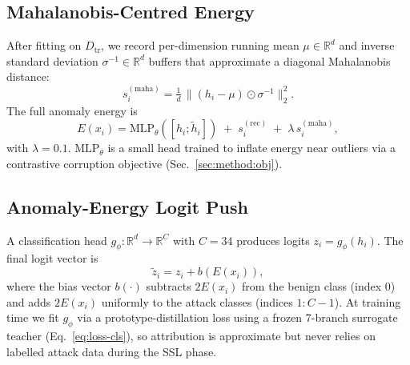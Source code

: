 \documentclass[journal,twoside]{IEEEtran}
\begin{document}
\subsection{Mahalanobis-Centred Energy}
After fitting on $D_\text{tr}$, we record per-dimension running mean
$\mu \in \mathbb{R}^d$ and inverse standard deviation $\sigma^{-1} \in
\mathbb{R}^d$ buffers that approximate a diagonal Mahalanobis distance:
\begin{equation}
  s^{(\text{maha})}_i = \tfrac{1}{d}\, \| (h_i - \mu) \odot \sigma^{-1} \|_2^2.
\end{equation}
The full anomaly energy is
\begin{equation}
  E(x_i) = \mathrm{MLP}_\theta\!\left([h_i; \tilde{h}_i]\right) \;+\; s^{(\text{rec})}_i \;+\; \lambda\, s^{(\text{maha})}_i,
  \label{eq:energy}
\end{equation}
with $\lambda{=}0.1$.  $\mathrm{MLP}_\theta$ is a small head trained to
inflate energy near outliers via a contrastive corruption objective
(Sec.~\ref{sec:method:obj}).

\subsection{Anomaly-Energy Logit Push}
A classification head $g_\phi : \mathbb{R}^d \to \mathbb{R}^{C}$ with
$C{=}34$ produces logits $z_i = g_\phi(h_i)$.  The final logit vector is
\begin{equation}
  \tilde{z}_i = z_i + b(E(x_i)),
\end{equation}
where the bias vector $b(\cdot)$ subtracts $2 E(x_i)$ from the benign
class (index 0) and adds $2 E(x_i)$ uniformly to the attack classes
(indices $1{:}C{-}1$).  At training time we fit $g_\phi$ via a
prototype-distillation loss using a frozen 7-branch surrogate teacher
(Eq.~\ref{eq:loss-cls}), so attribution is approximate but never
relies on labelled attack data during the SSL phase.
\end{document}
